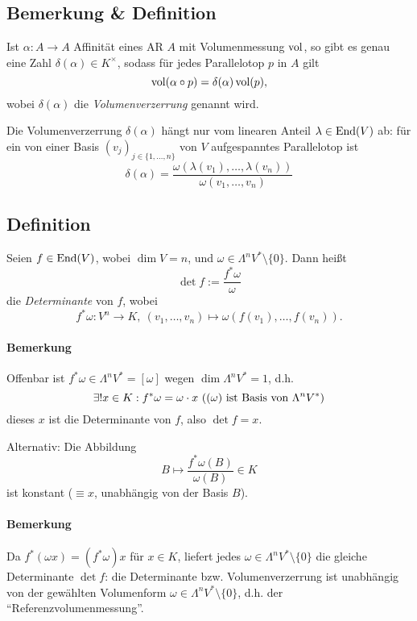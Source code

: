 \subsection{Bemerkung \& Definition}
	\begin{Definition}[Volumenverzerrung]
		Ist $ \alpha: A\to A $ Affinität eines AR $ A $ mit Volumenmessung $ \operatorname{vol} $, so gibt es genau eine Zahl $ \delta(\alpha)\in K^{\times} $, sodass für jedes Parallelotop $ p $ in $ A $ gilt
			\[ \operatorname{vol}(\alpha\circ p) = \delta(\alpha)\operatorname{vol}(p), \]
		wobei $ \delta(\alpha) $ die \emph{Volumenverzerrung} genannt wird.
		
		Die Volumenverzerrung $ \delta(\alpha) $ hängt nur vom linearen Anteil $ \lambda\in \operatorname{End}(V) $ ab: für ein von einer Basis $ (v_j)_{j\in \{1,\dots,n\}} $ von $ V $ aufgespanntes Parallelotop ist
			\[ \delta(\alpha) = \frac{\omega(\lambda(v_1),\dots,\lambda(v_n))}{\omega(v_1,\dots,v_n)} \]
	\end{Definition}
\subsection{Definition}
	\begin{Definition}
		Seien $ f\in\operatorname{End}(V) $, wobei $ \dim V=n $, und $ \omega\in \Lambda^nV^*\setminus \{0\} $. Dann heißt
		\[ \det f:= \frac{f^*\omega}{\omega} \]
	die \emph{Determinante} von $ f $, wobei
		\[ f^*\omega: V^n\to K,\ (v_1,\dots,v_n)\mapsto \omega(f(v_1),\dots,f(v_n)). \]
	\end{Definition}
\paragraph{Bemerkung}
	Offenbar ist $ f^*\omega\in \Lambda^nV^* = [\omega] $ wegen $ \dim \Lambda^nV^*=1 $, d.h.
		\[ \exists! x\in K: f^*\omega = \omega \cdot x \text{ ($(\omega) $ ist Basis von $ \Lambda^nV^* $)} \]
	dieses $ x $ ist die Determinante von $ f $, also $ \det f = x $.
	
	Alternativ: Die Abbildung
		\[ B\mapsto  \frac{f^*\omega(B)}{\omega(B)}\in K\]
	ist konstant ($ \equiv x $, unabhängig von der Basis $ B $).
\paragraph{Bemerkung}
	Da $ f^*(\omega x) = (f^*\omega)x $ für $ x\in K $, liefert jedes $ \omega \in \Lambda^nV^*\setminus\{0\} $ die gleiche Determinante $ \det f $: die Determinante bzw. Volumenverzerrung ist unabhängig von der gewählten Volumenform $ \omega\in \Lambda^nV^*\setminus \{0\} $, d.h. der "`Referenzvolumenmessung"'.
